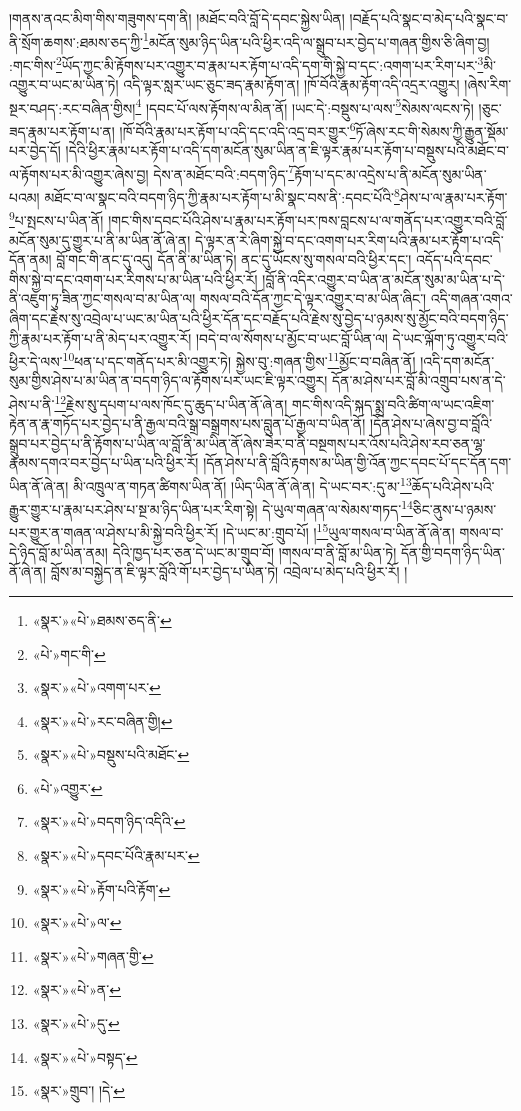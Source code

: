 །གནས་ནའང་མིག་གིས་གཟུགས་དག་ནི། །མཐོང་བའི་བློ་དེ་དབང་སྐྱེས་ཡིན། །བརྗོད་པའི་སྣང་བ་མེད་པའི་སྣང་བ་ནི་སྲོག་ཆགས་:ཐམས་ཅད་ཀྱི་\footnote{«སྣར་»«པེ་»ཐམས་ཅད་ནི་}མངོན་སུམ་ཉིད་ཡིན་པའི་ཕྱིར་འདི་ལ་སྒྲུབ་པར་བྱེད་པ་གཞན་གྱིས་ཅི་ཞིག་བྱ། :གང་གིས་\footnote{«པེ་»གང་གི་}ཡོད་ཀྱང་མི་རྟོགས་པར་འགྱུར་བ་རྣམ་པར་རྟོག་པ་འདི་དག་གི་སྐྱེ་བ་དང་:འགག་པར་རིག་པར་\footnote{«སྣར་»«པེ་»འགག་པར་}མི་འགྱུར་བ་ཡང་མ་ཡིན་ཏེ། འདི་ལྟར་སླར་ཡང་ཅུང་ཟད་རྣམ་རྟོག་ན། །ཁོ་བོའི་རྣམ་རྟོག་འདི་འདྲར་འགྱུར། །ཞེས་རིག་སྔར་བཤད་:རང་བཞིན་གྱིས།\footnote{«སྣར་»«པེ་»རང་བཞིན་གྱི།} །དབང་པོ་ལས་རྟོགས་ལ་མིན་ནོ། །ཡང་དེ་:བསྡུས་པ་ལས་\footnote{«སྣར་»«པེ་»བསྡུས་པའི་མཐོང་}སེམས་ལངས་ཏེ། །ཅུང་ཟད་རྣམ་པར་རྟོག་པ་ན། །ཁོ་བོའི་རྣམ་པར་རྟོག་པ་འདི་དང་འདི་འདྲ་བར་གྱུར་\footnote{«པེ་»འགྱུར་}ཏོ་ཞེས་རང་གི་སེམས་ཀྱི་རྒྱུན་སྡོམ་པར་བྱེད་དོ། །དེའི་ཕྱིར་རྣམ་པར་རྟོག་པ་འདི་དག་མངོན་སུམ་ཡིན་ན་ཇི་ལྟར་རྣམ་པར་རྟོག་པ་བསྡུས་པའི་མཐོང་བ་ལ་རྟོགས་པར་མི་འགྱུར་ཞེས་བྱ། དེས་ན་མཐོང་བའི་:བདག་ཉིད་\footnote{«སྣར་»«པེ་»བདག་ཉིད་འདིའི་}རྟོག་པ་དང་མ་འདྲེས་པ་ནི་མངོན་སུམ་ཡིན་པའམ། མཐོང་བ་ལ་སྣང་བའི་བདག་ཉིད་ཀྱི་རྣམ་པར་རྟོག་པ་མི་སྣང་བས་ནི་:དབང་པོའི་\footnote{«སྣར་»«པེ་»དབང་པོའི་རྣམ་པར་}ཤེས་པ་ལ་རྣམ་པར་རྟོག་\footnote{«སྣར་»«པེ་»རྟོག་པའི་རྟོག་}པ་སྤངས་པ་ཡིན་ནོ། །གང་གིས་དབང་པོའི་ཤེས་པ་རྣམ་པར་རྟོག་པར་ཁས་བླངས་པ་ལ་གནོད་པར་འགྱུར་བའི་བློ་མངོན་སུམ་དུ་གྱུར་པ་ནི་མ་ཡིན་ནོ་ཞེ་ན། དེ་ལྟར་ན་རེ་ཞིག་སྐྱེ་བ་དང་འགག་པར་རིག་པའི་རྣམ་པར་རྟོག་པ་འདི་དོན་ནམ། བློ་གང་གི་ནང་དུ་འདུ། དོན་ནི་མ་ཡིན་ཏེ། ནང་དུ་ཡོངས་སུ་གསལ་བའི་ཕྱིར་དང་། འདོད་པའི་དབང་གིས་སྐྱེ་བ་དང་འགག་པར་རིགས་པ་མ་ཡིན་པའི་ཕྱིར་རོ། །བློ་ནི་འདིར་འགྱུར་བ་ཡིན་ན་མངོན་སུམ་མ་ཡིན་པ་དེ་ནི་འཇུག་ཏུ་ཟིན་ཀྱང་གསལ་བ་མ་ཡིན་ལ། གསལ་བའི་དོན་ཀྱང་དེ་ལྟར་འགྱུར་བ་མ་ཡིན་ཞིང་། འདི་གཞན་འགའ་ཞིག་དང་རྗེས་སུ་འབྲེལ་པ་ཡང་མ་ཡིན་པའི་ཕྱིར་དོན་དང་བརྗོད་པའི་རྗེས་སུ་བྱེད་པ་ཉམས་སུ་མྱོང་བའི་བདག་ཉིད་ཀྱི་རྣམ་པར་རྟོག་པ་ནི་མེད་པར་འགྱུར་རོ། །བདེ་བ་ལ་སོགས་པ་མྱོང་བ་ཡང་བློ་ཡིན་ལ། དེ་ཡང་ལྐོག་ཏུ་འགྱུར་བའི་ཕྱིར་དེ་ལས་\footnote{«སྣར་»«པེ་»ལ་}ཕན་པ་དང་གནོད་པར་མི་འགྱུར་ཏེ། སྐྱེས་བུ་:གཞན་གྱིས་\footnote{«སྣར་»«པེ་»གཞན་གྱི་}མྱོང་བ་བཞིན་ནོ། །འདི་དག་མངོན་སུམ་གྱིས་ཤེས་པ་མ་ཡིན་ན་བདག་ཉིད་ལ་རྟོགས་པར་ཡང་ཇི་ལྟར་འགྱུར། དོན་མ་ཤེས་པར་བློ་མི་འགྲུབ་པས་ན་དེ་ཤེས་པ་ནི་\footnote{«སྣར་»«པེ་»ན་}རྗེས་སུ་དཔག་པ་ལས་ཁོང་དུ་ཆུད་པ་ཡིན་ནོ་ཞེ་ན། གང་གིས་འདི་སྐད་སྨྲ་བའི་ཚིག་ལ་ཡང་འཇིག་རྟེན་ན་རྣ་གཏོད་པར་བྱེད་པ་ནི་རྒྱལ་བའི་སྒྲ་བསྒྲགས་པས་བླུན་པོ་རྒྱལ་བ་ཡིན་ནོ། །དོན་ཤེས་པ་ཞེས་བྱ་བ་བློའི་སྒྲུབ་པར་བྱེད་པ་ནི་རྟོགས་པ་ཡིན་ལ་བློ་ནི་མ་ཡིན་ནོ་ཞེས་ཟེར་བ་ནི་བསྔགས་པར་འོས་པའི་ཤེས་རབ་ཅན་ལྷ་རྣམས་དགའ་བར་བྱེད་པ་ཡིན་པའི་ཕྱིར་རོ། །དོན་ཤེས་པ་ནི་བློའི་རྟགས་མ་ཡིན་གྱི་འོན་ཀྱང་དབང་པོ་དང་དོན་དག་ཡིན་ནོ་ཞེ་ན། མི་འཁྲུལ་ན་གཏན་ཚིགས་ཡིན་ནོ། །ཡིད་ཡིན་ནོ་ཞེ་ན། དེ་ཡང་བར་:དུ་མ་\footnote{«སྣར་»«པེ་»དུ་}ཆོད་པའི་ཤེས་པའི་རྒྱུར་གྱུར་པ་རྣམ་པར་ཤེས་པ་སྔ་མ་ཉིད་ཡིན་པར་རིག་སྟེ། དེ་ཡུལ་གཞན་ལ་སེམས་གཏད་\footnote{«སྣར་»«པེ་»བསྟད་}ཅིང་ནུས་པ་ཉམས་པར་གྱུར་ན་གཞན་ལ་ཤེས་པ་མི་སྐྱེ་བའི་ཕྱིར་རོ། །དེ་ཡང་མ་:གྲུབ་པོ། །\footnote{«སྣར་»གྲུབ་། །དེ་}ཡུལ་གསལ་བ་ཡིན་ནོ་ཞེ་ན། གསལ་བ་དེ་ཉིད་བློ་མ་ཡིན་ནམ། དེའི་ཁྱད་པར་ཅན་དེ་ཡང་མ་གྲུབ་བོ། །གསལ་བ་ནི་བློ་མ་ཡིན་ཏེ། དོན་གྱི་བདག་ཉིད་ཡིན་ནོ་ཞེ་ན། བློས་མ་བསྐྱེད་ན་ཇི་ལྟར་བློའི་གོ་པར་བྱེད་པ་ཡིན་ཏེ། འབྲེལ་པ་མེད་པའི་ཕྱིར་རོ། །
